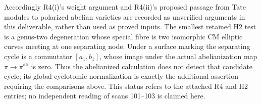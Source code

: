 \documentclass[11pt,a4paper]{article}
\begin{document}
Accordingly R4(i)'s weight argument and R4(ii)'s proposed passage from
Tate modules to polarized abelian varieties are recorded as unverified
arguments in this deliverable, rather than used as proved inputs. The
smallest retained H2 test is a genus-two degeneration whose special
fibre is two isomorphic CM elliptic curves meeting at one separating
node. Under a surface marking the separating cycle is a commutator
$[a_1,b_1]$, whose image under the actual abelianization map
$\pi\to\pi^{\mathrm{ab}}$ is zero. Thus the abelianized calculation
does not detect that candidate cycle; its global cyclotomic
normalization is exactly the additional assertion requiring the
comparisons above. This status refers to the attached R4 and H2
entries; no independent reading of scans 101--103 is claimed here.


\nocite{Cote149,LongueMarche,GrothendieckFaltings1983}


\end{document}
